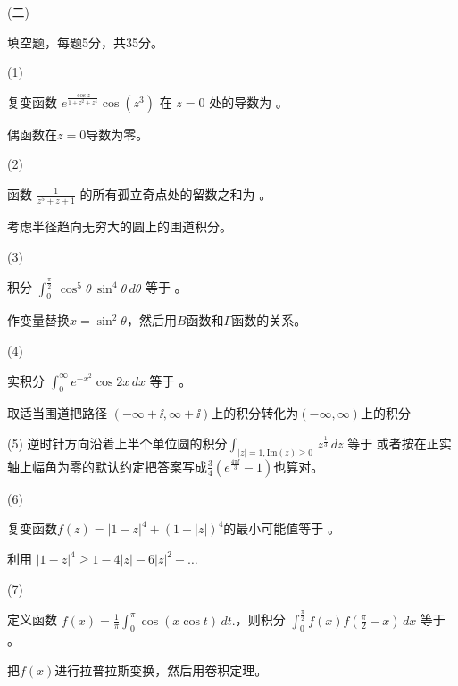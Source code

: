 \documentclass[12pt,CJK]{article}
\begin{document}
\item[(二)]{ 填空题，每题5分，共35分。

  \bitem  
\item[(1)]{复变函数 $e^{\frac{\cos z}{1+z^2+z^4}}\cos{(z^3)}$ 在 $z=0$ 处的导数为  。

  {\small \red 偶函数在$z=0$导数为零。}

}  
\item[(2)]{函数 $\frac{1}{z^{5}+z+1}$ 的所有孤立奇点处的留数之和为 。


  {\small \red 考虑半径趋向无穷大的圆上的围道积分。} 
}  
\item[(3)]{积分 $\int_0^{\frac{\pi}{2}}\, \cos^5\theta \, \sin^4\theta\, d\theta$ 等于  。


  {\small \red 作变量替换$x = \sin^2\theta$，然后用$B$函数和$\Gamma$函数的关系。}
}
  
\item[(4)]{实积分 $\int_0^\infty e^{-x^2}\cos{2x}\,dx$ 等于  。

  {\small \red 取适当围道把路径 $(-\infty+\ii, \infty +\ii)$上的积分转化为$(-\infty,\infty)$上的积分 }
}
\item[(5)]{逆时针方向沿着上半个单位圆的积分$\int_{|z|=1, \mathrm{Im}(z)\ge 0}\, z^{\frac{1}{3}}\,dz$ 等于   {\small \red 或者按在正实轴上幅角为零的默认约定把答案写成$\frac{3}{4}\left(e^{\frac{4\pi\ii}{3}}-1\right)$也算对。}}
\item[(6)]{复变函数$f(z) = |1-z|^4 + (1+|z|)^4$的最小可能值等于 。

{\small \red 利用 $|1-z|^4\ge 1 - 4|z|-6|z|^2 - \ldots$}
}   
\item[(7)]{定义函数  $f(x) = \frac{1}{\pi}\int_0^\pi \cos{\left( x \cos t\right)} \, dt. $，则积分 $\int_0^{\frac{\pi}{2}} f(x)f(\frac{\pi}{2}-x)\,dx$ 等于 。

  {\small \red 把$f(x)$进行拉普拉斯变换，然后用卷积定理。 }
}
\eitem

  }
  
\end{document}
